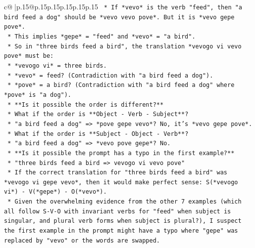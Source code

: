\documentclass{article}
\begin{document}
{\begin{supertabular}{c@{$\;$}|p{.15\linewidth}@{}p{.15\linewidth}p{.15\linewidth}p{.15\linewidth}p{.15\linewidth}p{.15\linewidth}}
{{{\texttt{                                                    *   If *vevo* is the verb "feed", then "a bird feed a dog" should be *vevo vevo pove*. But it is *vevo gepe pove*.} \\
\texttt{                                                    *   This implies *gepe* = "feed" and *vevo* = "a bird".} \\
\texttt{                                                    *   So in "three birds feed a bird", the translation *vevogo vi vevo pove* must be:} \\
\texttt{                                                        *   *vevogo vi* = three birds.} \\
\texttt{                                                        *   *vevo* = feed? (Contradiction with "a bird feed a dog").} \\
\texttt{                                                        *   *pove* = a bird? (Contradiction with "a bird feed a dog" where *pove* is "a dog").} \\
\texttt{                                                    *   **Is it possible the order is different?**} \\
\texttt{                                                    *   What if the order is **Object {-} Verb {-} Subject**?} \\
\texttt{                                                        *   "a bird feed a dog" => *pove gepe vevo*? No, it's *vevo gepe pove*.} \\
\texttt{                                                    *   What if the order is **Subject {-} Object {-} Verb**?} \\
\texttt{                                                        *   "a bird feed a dog" => *vevo pove gepe*? No.} \\
\texttt{                                                    *   **Is it possible the prompt has a typo in the first example?**} \\
\texttt{                                                    *   "three birds feed a bird => vevogo vi vevo pove"} \\
\texttt{                                                    *   If the correct translation for "three birds feed a bird" was *vevogo vi gepe vevo*, then it would make perfect sense: S(*vevogo vi*) {-} V(*gepe*) {-} O(*vevo*).} \\
\texttt{                                                    *   Given the overwhelming evidence from the other 7 examples (which all follow S{-}V{-}O with invariant verbs for "feed" when subject is singular, and plural verb forms when subject is plural?), I suspect the first example in the prompt might have a typo where "gepe" was replaced by "vevo" or the words are swapped.} \\
}}}
\end{supertabular}}
\end{document}
